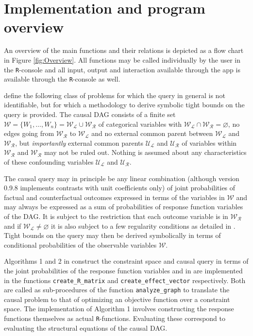 \hypertarget{implementation-and-program-overview}{%
\section{Implementation and program overview}\label{implementation-and-program-overview}}

An overview of the main functions and their relations is depicted as a flow chart in Figure \ref{fig:Overview}. All functions may be called individually by the user in the \texttt{R}-console and all input, output and interaction available through the  app is available through the \texttt{R}-console as well.

\citet{generalcausalbounds} define the following class of problems for which the query in general is not identifiable, but for which a methodology to derive symbolic tight bounds on the query is provided.
The causal DAG consists of a finite set \(\mathcal{W}=\{W_1,\dots,W_n\}=\mathcal{W}_\mathcal{L}\cup\mathcal{W}_\mathcal{R}\) of categorical variables with \(\mathcal{W}_\mathcal{L}\cap\mathcal{W}_\mathcal{R}=\varnothing\), no edges going from \(\mathcal{W}_\mathcal{R}\) to \(\mathcal{W}_\mathcal{L}\) and no external common parent between \(\mathcal{W}_\mathcal{L}\) and \(\mathcal{W}_\mathcal{R}\), but \emph{importantly} external common parents \(\mathcal{U}_\mathcal{L}\) and \(\mathcal{U}_\mathcal{R}\) of variables within \(\mathcal{W}_\mathcal{R}\) and \(\mathcal{W}_\mathcal{R}\) may not be ruled out. Nothing is assumed about any characteristics of these confounding variables \(\mathcal{U}_\mathcal{L}\) and \(\mathcal{U}_\mathcal{R}\).

The causal query may in principle be any linear combination (although  version 0.9.8 implements contrasts with unit coefficients only) of joint probabilities of factual and counterfactual outcomes expressed in terms of the variables in \(\mathcal{W}\) and may always be expressed as a sum of probabilities of response function variables of the DAG. It is subject to the restriction that each outcome variable is in \(\mathcal{W}_\mathcal{R}\) and if \(\mathcal{W}_\mathcal{L}\ne\varnothing\) it is also subject to a few regularity conditions as detailed in \citet{generalcausalbounds}. Tight bounds on the query may then be derived symbolically in terms of conditional probabilities of the observable variables \(\mathcal{W}\).

Algorithms 1 and 2 in \citet{generalcausalbounds} construct the constraint space and causal query in terms of the joint probabilities of the response function variables and in  are implemented in the functions \texttt{create\_R\_matrix} and \texttt{create\_effect\_vector} respectively. Both are called as sub-procedures of the function \texttt{analyze\_graph} to translate the causal problem to that of optimizing an objective function over a constraint space. The implementation of Algorithm 1 involves constructing the response functions themselves as actual \texttt{R}-functions. Evaluating these correspond to evaluating the structural equations of the causal DAG.

